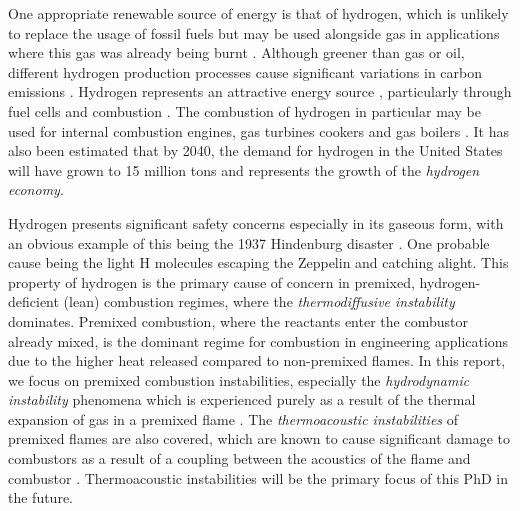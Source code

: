 One appropriate renewable source of energy is that of hydrogen, which is unlikely to replace the usage of fossil fuels but may be used alongside gas in applications where this gas was already being burnt \cite{momirlan2005PropertiesHydrogenFuel}. Although greener than gas or oil, different hydrogen production processes \cite{dasilvaveras2017HydrogenTrendsProduction} cause significant variations in carbon emissions \cite{nationalgrid2022HeatingOurHomes}. Hydrogen represents an attractive energy source \cite{momirlan2005PropertiesHydrogenFuel}, particularly through fuel cells \cite{momirlan2005PropertiesHydrogenFuel} and combustion \cite{lanz2001Module3Hydrogen, stepien2021ComprehensiveOverviewHydrogenFueled}. The combustion of hydrogen in particular may be used for internal combustion engines, gas turbines cookers and gas boilers \cite{momirlan2005PropertiesHydrogenFuel}. It has also been estimated that by 2040, the demand for hydrogen in the United States will have grown to 15 million tons \cite{molkov2007HydrogenSafetyResearch} and represents the growth of the \emph{hydrogen economy}.

Hydrogen presents significant safety concerns \cite{green2006HydrogenSafetyIssues} especially in its gaseous form, with an obvious example of this being the 1937 Hindenburg disaster \cite{dilisi2017HindenburgDisasterCombining}. One probable cause being the light H molecules escaping the Zeppelin and catching alight. This property of hydrogen is the primary cause of concern in premixed, hydrogen-deficient (lean) combustion regimes, where the \emph{thermodiffusive instability} dominates. Premixed combustion, where the reactants enter the combustor already mixed, is the dominant regime for combustion in engineering applications due to the higher heat released compared to non-premixed flames. In this report, we focus on premixed combustion instabilities, especially the \emph{hydrodynamic instability} phenomena which is experienced purely as a result of the thermal expansion of gas in a premixed flame \cite{matalon2018DarrieusLandauInstability}. The \emph{thermoacoustic instabilities} of premixed flames are also covered, which are known to cause significant damage to combustors as a result of a coupling between the acoustics of the flame and combustor \cite{morgans2024ThermoacousticInstabilityCombustors}. Thermoacoustic instabilities will be the primary focus of this PhD in the future.

